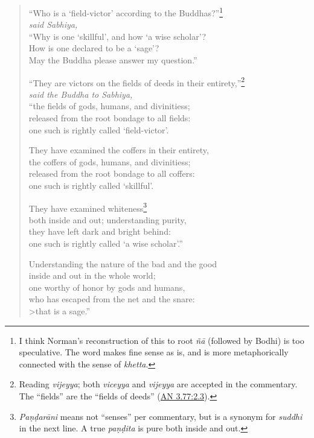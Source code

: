 \documentclass[12pt,openany]{book}%
\newcommand*{\scspeaker}[1]{\hspace{2em}\textit{#1}}
\begin{document}
\begin{verse}%
“Who is a ‘field-victor’ according to the Buddhas?”\footnote{I think Norman’s reconstruction of this to root \textit{\textsanskrit{ñā}} (followed by Bodhi) is too speculative. The word makes fine sense as is, and is more metaphorically connected with the sense of \textit{khetta}. } \\
\scspeaker{said Sabhiya, }\\
“Why is one ‘skillful’, and how ‘a wise scholar’? \\
How is one declared to be a ‘sage’? \\
May the Buddha please answer my question.” 

“They are victors on the fields of deeds in their entirety,”\footnote{Reading \textit{vijeyya}; both \textit{viceyya} and \textit{vijeyya} are accepted in the commentary. The “fields” are the “fields of deeds” (\href{https://suttacentral.net/an3.77/en/sujato\#2.3}{AN 3.77:2.3}). } \\
\scspeaker{said the Buddha to Sabhiya, }\\
“the fields of gods, humans, and divinitiess; \\
released from the root bondage to all fields: \\
one such is rightly called ‘field-victor’. 

They have examined the coffers in their entirety, \\
the coffers of gods, humans, and divinitiess; \\
released from the root bondage to all coffers: \\
one such is rightly called ‘skillful’. 

They have examined whiteness\footnote{\textit{\textsanskrit{Paṇḍarāni}} means not “senses” per commentary, but is a synonym for \textit{suddhi} in the next line. A true \textit{\textsanskrit{paṇḍita}} is pure both inside and out. } \\
both inside and out; understanding purity, \\
they have left dark and bright behind: \\
one such is rightly called ‘a wise scholar’.” 

Understanding the nature of the bad and the good \\
inside and out in the whole world; \\
one worthy of honor by gods and humans, \\
who has escaped from the net and the snare: \\>that is a sage.” 

%
\end{verse}
\end{document}
